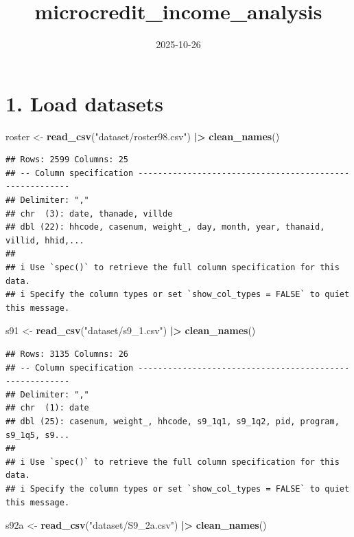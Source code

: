\documentclass[
]{article}
\title{microcredit\_income\_analysis}
\author{}
\date{\vspace{-2.5em}2025-10-26}
\newenvironment{Shaded}{\begin{snugshade}}{\end{snugshade}}
\newcommand{\FunctionTok}[1]{\textcolor[rgb]{0.13,0.29,0.53}{\textbf{#1}}}
\newcommand{\NormalTok}[1]{#1}
\newcommand{\OtherTok}[1]{\textcolor[rgb]{0.56,0.35,0.01}{#1}}
\newcommand{\SpecialCharTok}[1]{\textcolor[rgb]{0.81,0.36,0.00}{\textbf{#1}}}
\newcommand{\StringTok}[1]{\textcolor[rgb]{0.31,0.60,0.02}{#1}}
\begin{document}
\maketitle

\section{1. Load datasets}\label{load-datasets}

\begin{Shaded}
\begin{Highlighting}[]
\NormalTok{roster }\OtherTok{\textless{}{-}} \FunctionTok{read\_csv}\NormalTok{(}\StringTok{"dataset/roster98.csv"}\NormalTok{) }\SpecialCharTok{|\textgreater{}} 
  \FunctionTok{clean\_names}\NormalTok{()}
\end{Highlighting}
\end{Shaded}

\begin{verbatim}
## Rows: 2599 Columns: 25
## -- Column specification --------------------------------------------------------
## Delimiter: ","
## chr  (3): date, thanade, villde
## dbl (22): hhcode, casenum, weight_, day, month, year, thanaid, villid, hhid,...
## 
## i Use `spec()` to retrieve the full column specification for this data.
## i Specify the column types or set `show_col_types = FALSE` to quiet this message.
\end{verbatim}

\begin{Shaded}
\begin{Highlighting}[]
\NormalTok{s91 }\OtherTok{\textless{}{-}} \FunctionTok{read\_csv}\NormalTok{(}\StringTok{"dataset/s9\_1.csv"}\NormalTok{) }\SpecialCharTok{|\textgreater{}} 
  \FunctionTok{clean\_names}\NormalTok{()}
\end{Highlighting}
\end{Shaded}

\begin{verbatim}
## Rows: 3135 Columns: 26
## -- Column specification --------------------------------------------------------
## Delimiter: ","
## chr  (1): date
## dbl (25): casenum, weight_, hhcode, s9_1q1, s9_1q2, pid, program, s9_1q5, s9...
## 
## i Use `spec()` to retrieve the full column specification for this data.
## i Specify the column types or set `show_col_types = FALSE` to quiet this message.
\end{verbatim}

\begin{Shaded}
\begin{Highlighting}[]
\NormalTok{s92a }\OtherTok{\textless{}{-}} \FunctionTok{read\_csv}\NormalTok{(}\StringTok{"dataset/S9\_2a.csv"}\NormalTok{) }\SpecialCharTok{|\textgreater{}} 
  \FunctionTok{clean\_names}\NormalTok{()}
\end{Highlighting}
\end{Shaded}
\end{document}
